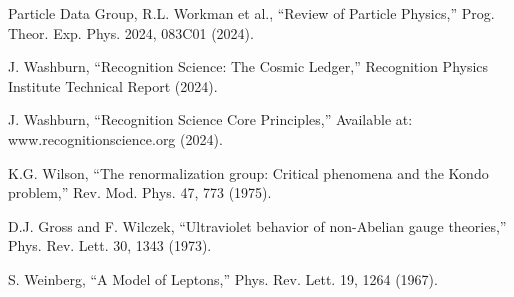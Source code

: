 \documentclass[11pt,a4paper]{article}
\theoremstyle{definition}
\begin{document}
\begin{thebibliography}{99}

 Particle Data Group, R.L. Workman et al., ``Review of Particle Physics,'' Prog. Theor. Exp. Phys. 2024, 083C01 (2024).

 J. Washburn, ``Recognition Science: The Cosmic Ledger,'' Recognition Physics Institute Technical Report (2024).

 J. Washburn, ``Recognition Science Core Principles,'' Available at: www.recognitionscience.org (2024).

 K.G. Wilson, ``The renormalization group: Critical phenomena and the Kondo problem,'' Rev. Mod. Phys. 47, 773 (1975).

 D.J. Gross and F. Wilczek, ``Ultraviolet behavior of non-Abelian gauge theories,'' Phys. Rev. Lett. 30, 1343 (1973).

 S. Weinberg, ``A Model of Leptons,'' Phys. Rev. Lett. 19, 1264 (1967).

\end{thebibliography}
\end{document}
